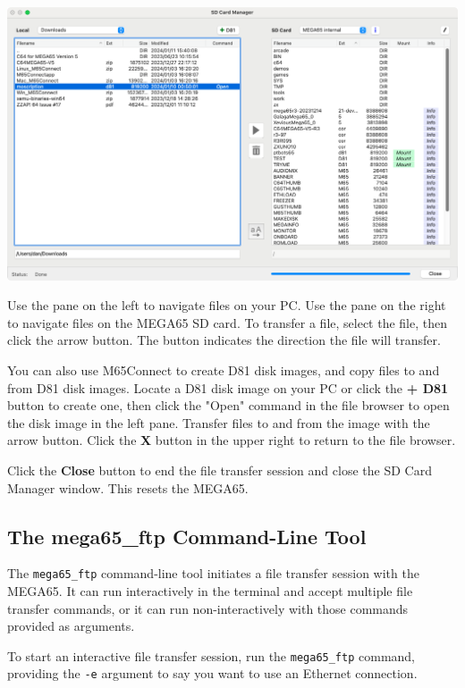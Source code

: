 \begin{center}
\includegraphics[width=\linewidth]{images/m65connect_files.png}
\end{center}

Use the pane on the left to navigate files on your PC. Use the pane on the right to navigate files on the MEGA65 SD card. To transfer a file, select the file, then click the arrow button. The button indicates the direction the file will transfer.

You can also use M65Connect to create D81 disk images, and copy files to and from D81 disk images. Locate a D81 disk image on your PC or click the {\bf + D81} button to create one, then click the "Open" command in the file browser to open the disk image in the left pane. Transfer files to and from the image with the arrow button. Click the {\bf X} button in the upper right to return to the file browser.

Click the {\bf Close} button to end the file transfer session and close the SD Card Manager window. This resets the MEGA65.

\subsection{The mega65\_ftp Command-Line Tool}

The {\tt mega65\_ftp} command-line tool initiates a file transfer session with the MEGA65. It can run interactively in the terminal and accept multiple file transfer commands, or it can run non-interactively with those commands provided as arguments.

To start an interactive file transfer session, run the {\tt mega65\_ftp} command, providing the {\tt -e} argument to say you want to use an Ethernet connection.

